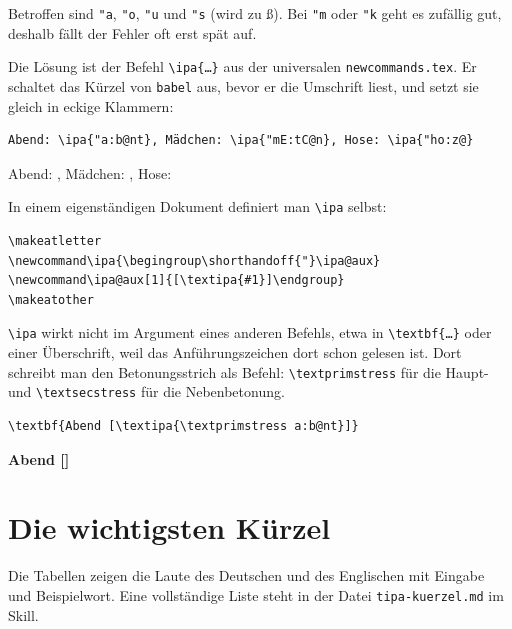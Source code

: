 Betroffen sind \texttt{"a}, \texttt{"o}, \texttt{"u} und \texttt{"s} (wird zu ß). Bei \texttt{"m} oder \texttt{"k} geht es zufällig gut, deshalb fällt der Fehler oft erst spät auf.

Die Lösung ist der Befehl \texttt{\textbackslash ipa\{\dots\}} aus der universalen \texttt{newcommands.tex}. Er schaltet das Kürzel von \texttt{babel} aus, bevor er die Umschrift liest, und setzt sie gleich in eckige Klammern:

\begin{lstlisting}[style=latex]
Abend: \ipa{"a:b@nt}, Mädchen: \ipa{"mE:tC@n}, Hose: \ipa{"ho:z@}
\end{lstlisting}

\begin{ausgabe}
	Abend: , Mädchen: , Hose: 
\end{ausgabe}

In einem eigenständigen Dokument definiert man \texttt{\textbackslash ipa} selbst:

\begin{lstlisting}[style=latex]
\makeatletter
\newcommand\ipa{\begingroup\shorthandoff{"}\ipa@aux}
\newcommand\ipa@aux[1]{[\textipa{#1}]\endgroup}
\makeatother
\end{lstlisting}

\texttt{\textbackslash ipa} wirkt nicht im Argument eines anderen Befehls, etwa in \texttt{\textbackslash textbf\{\dots\}} oder einer Überschrift, weil das Anführungszeichen dort schon gelesen ist. Dort schreibt man den Betonungsstrich als Befehl: \texttt{\textbackslash textprimstress} für die Haupt- und \texttt{\textbackslash textsecstress} für die Nebenbetonung.

\begin{lstlisting}[style=latex]
\textbf{Abend [\textipa{\textprimstress a:b@nt}]}
\end{lstlisting}

\begin{ausgabe}
	\textbf{Abend []}
\end{ausgabe}



\section{Die wichtigsten Kürzel}

Die Tabellen zeigen die Laute des Deutschen und des Englischen mit Eingabe und Beispielwort. Eine vollständige Liste steht in der Datei \texttt{tipa-kuerzel.md} im Skill.


